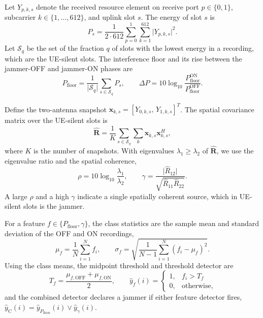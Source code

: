 \documentclass[conference]{IEEEtran}
\begin{document}
Let $Y_{p,k,s}$ denote the received resource element on receive port
$p\in\{0,1\}$, subcarrier $k\in\{1,\dots,612\}$, and uplink slot $s$. The
energy of slot $s$ is
\begin{equation}
P_s=\frac{1}{2\cdot 612}\sum_{p=0}^{1}\sum_{k=1}^{612}\lvert Y_{p,k,s}\rvert^{2}.
\end{equation}
Let $\mathcal S_q$ be the set of the fraction $q$ of slots with the lowest
energy in a recording, which are the UE-silent slots. The interference floor
and its rise between the jammer-OFF and jammer-ON phases are
\begin{equation}
P_{\mathrm{floor}}=\frac{1}{\lvert\mathcal S_q\rvert}\sum_{s\in\mathcal S_q}P_s,
\qquad
\Delta P=10\log_{10}\frac{P_{\mathrm{floor}}^{\mathrm{ON}}}{P_{\mathrm{floor}}^{\mathrm{OFF}}}.
\end{equation}

Define the two-antenna snapshot $\mathbf x_{k,s}=[Y_{0,k,s},\,Y_{1,k,s}]^{T}$.
The spatial covariance matrix over the UE-silent slots is
\begin{equation}
\hat{\mathbf R}=\frac{1}{K}\sum_{s\in\mathcal S_q}\sum_{k}\mathbf x_{k,s}\mathbf x_{k,s}^{H},
\end{equation}
where $K$ is the number of snapshots. With eigenvalues
$\lambda_1\ge\lambda_2$ of $\hat{\mathbf R}$, we use the eigenvalue ratio and
the spatial coherence,
\begin{equation}
\rho=10\log_{10}\frac{\lambda_1}{\lambda_2},
\qquad
\gamma=\frac{\lvert\hat R_{12}\rvert}{\sqrt{\hat R_{11}\hat R_{22}}}.
\end{equation}
A large $\rho$ and a high $\gamma$ indicate a single spatially coherent source,
which in UE-silent slots is the jammer.

For a feature $f\in\{P_{\mathrm{floor}},\gamma\}$, the class statistics are
the sample mean and standard deviation of the OFF and ON recordings,
\begin{equation}
\mu_f=\frac{1}{N}\sum_{i=1}^{N}f_i,\qquad
\sigma_f=\sqrt{\frac{1}{N-1}\sum_{i=1}^{N}(f_i-\mu_f)^2}.
\end{equation}
Using the class means, the midpoint threshold and threshold detector are
\begin{equation}
T_f=\frac{\mu_{f,\mathrm{OFF}}+\mu_{f,\mathrm{ON}}}{2},\qquad
\hat y_f(i)=\begin{cases}1,& f_i>T_f\\0,&\text{otherwise,}\end{cases}
\end{equation}
and the combined detector declares a jammer if either feature detector fires,
$\hat y_{\mathrm C}(i)=\hat y_{P_{\mathrm{floor}}}(i)\lor\hat y_{\gamma}(i)$.
\end{document}
